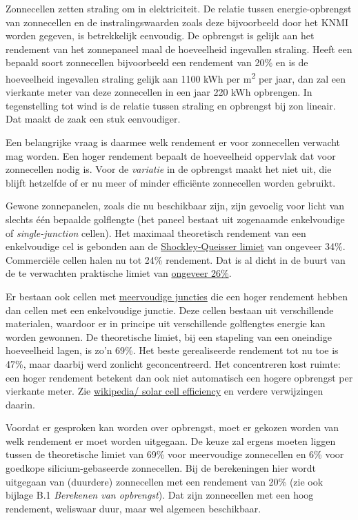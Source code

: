 \documentclass[
  11pt,
  a4paper,
]{book}
\begin{document}
Zonnecellen zetten straling om in elektriciteit. De relatie tussen energie-opbrengst van zonnecellen en de instralingswaarden zoals deze bijvoorbeeld door het KNMI worden gegeven, is betrekkelijk eenvoudig. De opbrengst is gelijk aan het rendement van het zonnepaneel maal de hoeveelheid ingevallen straling. Heeft een bepaald soort zonnecellen bijvoorbeeld een rendement van 20\% en is de hoeveelheid ingevallen straling gelijk aan 1100 kWh per m\textsuperscript{2} per jaar, dan zal een vierkante meter van deze zonnecellen in een jaar 220 kWh opbrengen. In tegenstelling tot wind is de relatie tussen straling en opbrengst bij zon lineair. Dat maakt de zaak een stuk eenvoudiger.

Een belangrijke vraag is daarmee welk rendement er voor zonnecellen verwacht mag worden. Een hoger rendement bepaalt de hoeveelheid oppervlak dat voor zonnecellen nodig is. Voor de \emph{variatie} in de opbrengst maakt het niet uit, die blijft hetzelfde of er nu meer of minder efficiënte zonnecellen worden gebruikt.

Gewone zonnepanelen, zoals die nu beschikbaar zijn, zijn gevoelig voor licht van slechts één bepaalde golflengte (het paneel bestaat uit zogenaamde enkelvoudige of \emph{single-junction} cellen). Het maximaal theoretisch rendement van een enkelvoudige cel is gebonden aan de \href{https://en.wikipedia.org/wiki/Shockley\%E2\%80\%93Queisser_limit}{Shockley-Queisser limiet} van ongeveer 34\%. Commerciële cellen halen nu tot 24\% rendement. Dat is al dicht in de buurt van de te verwachten praktische limiet van \href{https://en.wikipedia.org/wiki/Solar_cell}{ongeveer 26\%}.

Er bestaan ook cellen met \href{https://en.wikipedia.org/wiki/Multi-junction_solar_cell}{meervoudige juncties} die een hoger rendement hebben dan cellen met een enkelvoudige junctie. Deze cellen bestaan uit verschillende materialen, waardoor er in principe uit verschillende golflengtes energie kan worden gewonnen. De theoretische limiet, bij een stapeling van een oneindige hoeveelheid lagen, is zo'n 69\%. Het beste gerealiseerde rendement tot nu toe is 47\%, maar daarbij werd zonlicht geconcentreerd. Het concentreren kost ruimte: een hoger rendement betekent dan ook niet automatisch een hogere opbrengst per vierkante meter. Zie \href{https://en.wikipedia.org/wiki/Solar_cell_efficiency}{wikipedia/ solar cell efficiency} en verdere verwijzingen daarin.

\bigskip\noindent
Voordat er gesproken kan worden over opbrengst, moet er gekozen worden van welk rendement er moet worden uitgegaan. De keuze zal ergens moeten liggen tussen de theoretische limiet van 69\% voor meervoudige zonnecellen en 6\% voor goedkope silicium-gebaseerde zonnecellen. Bij de berekeningen hier wordt uitgegaan van (duurdere) zonnecellen met een rendement van 20\% (zie ook bijlage B.1 \emph{Berekenen van opbrengst}). Dat zijn zonnecellen met een hoog rendement, weliswaar duur, maar wel algemeen beschikbaar.
\end{document}
